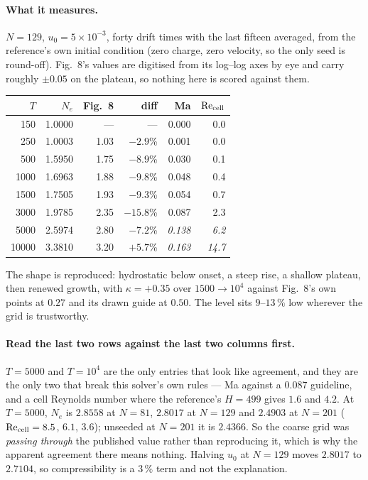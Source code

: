 \documentclass[11pt,a4paper]{article}
\begin{document}
\paragraph{What it measures.} $N=129$, $u_0=5\times10^{-3}$, forty drift times with the
last fifteen averaged, from the reference's own initial condition (zero charge, zero
velocity, so the only seed is round-off). Fig.~8's values are digitised from its
log--log axes by eye and carry roughly $\pm0.05$ on the plateau, so nothing here is
scored against them.

\begin{center}
\begin{tabular}{rrrrrr}
\hline
$T$ & $N_e$ & Fig.~8 & diff & Ma & $\mathrm{Re}_{\rm cell}$ \\
\hline
  150 & 1.0000 & ---  & ---      & 0.000 & 0.0 \\
  250 & 1.0003 & 1.03 & $-2.9$\% & 0.001 & 0.0 \\
  500 & 1.5950 & 1.75 & $-8.9$\% & 0.030 & 0.1 \\
 1000 & 1.6963 & 1.88 & $-9.8$\% & 0.048 & 0.4 \\
 1500 & 1.7505 & 1.93 & $-9.3$\% & 0.054 & 0.7 \\
 3000 & 1.9785 & 2.35 & $-15.8$\% & 0.087 & 2.3 \\
 5000 & 2.5974 & 2.80 & $-7.2$\% & \emph{0.138} & \emph{6.2} \\
10000 & 3.3810 & 3.20 & $+5.7$\% & \emph{0.163} & \emph{14.7} \\
\hline
\end{tabular}
\end{center}

The shape is reproduced: hydrostatic below onset, a steep rise, a shallow plateau, then
renewed growth, with $\kappa=+0.35$ over $1500\to10^4$ against Fig.~8's own points at
$0.27$ and its drawn guide at $0.50$. The level sits $9$--$13\,\%$ low wherever the grid
is trustworthy.

\paragraph{Read the last two rows against the last two columns first.} $T=5000$ and
$T=10^4$ are the only entries that look like agreement, and they are the only two that
break this solver's own rules --- Ma against a $0.087$ guideline, and a cell Reynolds
number where the reference's $H=499$ gives $1.6$ and $4.2$. At $T=5000$, $N_e$ is
$2.8558$ at $N=81$, $2.8017$ at $N=129$ and $2.4903$ at $N=201$
($\mathrm{Re}_{\rm cell}=8.5$, $6.1$, $3.6$); unseeded at $N=201$ it is $2.4366$. So the
coarse grid was \emph{passing through} the published value rather than reproducing it,
which is why the apparent agreement there means nothing. Halving $u_0$ at $N=129$ moves
$2.8017$ to $2.7104$, so compressibility is a $3\,\%$ term and not the explanation.
\end{document}
